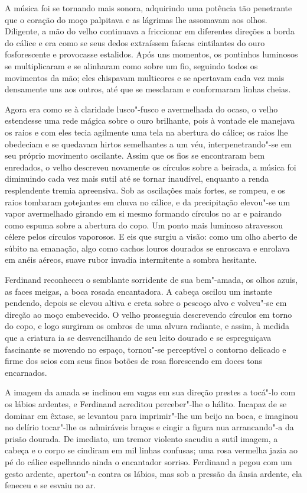 A música foi se tornando mais sonora, adquirindo uma potência tão
penetrante que o coração do moço palpitava e as lágrimas lhe assomavam
aos olhos. Diligente, a mão do velho continuava a friccionar em
diferentes direções a borda do cálice e era como se seus dedos
extraíssem faíscas cintilantes do ouro fosforescente e provocasse
estalidos. Após uns momentos, os pontinhos luminosos se multiplicaram e
se alinharam como sobre um fio, seguindo todos os movimentos da mão;
eles chispavam multicores e se apertavam cada vez mais densamente uns
aos outros, até que se mesclaram e conformaram linhas cheias. 

Agora era como se à claridade lusco"-fusco e avermelhada do ocaso, o velho
estendesse uma rede mágica sobre o ouro brilhante, pois à vontade ele
manejava os raios e com eles tecia agilmente uma tela na abertura do
cálice; os raios lhe obedeciam e se quedavam hirtos semelhantes a um
véu, interpenetrando"-se em seu próprio movimento oscilante. Assim que
os fios se encontraram bem enredados, o velho descreveu novamente os
círculos sobre a beirada, a música foi diminuindo cada vez mais sutil
até se tornar inaudível, enquanto a renda resplendente tremia
apreensiva. Sob as oscilações mais fortes, se rompeu, e os raios
tombaram gotejantes em chuva no cálice, e da precipitação elevou"-se um
vapor avermelhado girando em si mesmo formando círculos no ar e
pairando como espuma sobre a abertura do copo. Um ponto mais luminoso
atravessou célere pelos círculos vaporosos. E eis que surgiu a visão:
como um olho aberto de súbito na emanação, algo como cachos louros
dourados se enroscava e \mbox{enrolava} em anéis aéreos, suave rubor 
invadia intermitente a sombra hesitante.

Ferdinand reconheceu o semblante sorridente de sua bem"-amada, os olhos
azuis, as faces meigas, a boca rosada encantadora. A cabeça oscilou um
instante pendendo, depois se elevou altiva e ereta sobre o pescoço alvo
e volveu"-se em direção ao moço embevecido. O velho prosseguia
descrevendo círculos em torno do copo, e logo surgiram os ombros de uma
alvura radiante, e assim, à medida que a criatura ia se desvencilhando
de seu leito dourado e se espreguiçava fascinante se movendo no espaço,
tornou"-se perceptível o contorno delicado e firme dos seios com seus
finos botões de rosa florescendo em doces tons encarnados. 

A imagem da amada se inclinou em vagas em sua direção prestes a tocá"-lo
com os lábios ardentes, e Ferdinand acreditou perceber"-lhe o hálito.
Incapaz de se dominar em êxtase, se levantou para imprimir"-lhe um beijo
na boca, e imaginou no delírio tocar"-lhe os admiráveis braços e cingir
a figura nua arrancando"-a da prisão dourada. De imediato, um tremor
violento sacudiu a sutil imagem, a cabeça e o corpo se cindiram em mil
linhas confusas; uma rosa vermelha jazia ao pé do cálice espelhando
ainda o encantador sorriso. Ferdinand a pegou com um gesto ardente,
apertou"-a contra os lábios, mas sob a pressão da ânsia ardente, ela
feneceu e se esvaiu no ar. 

